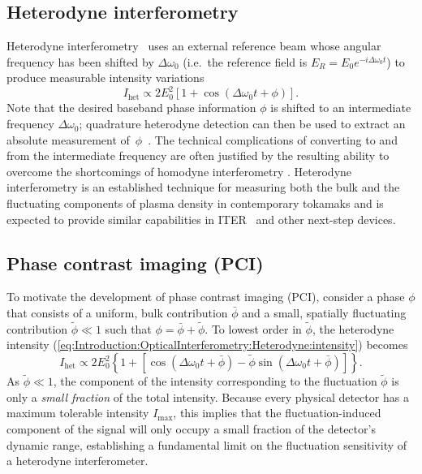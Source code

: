 \subsection{Heterodyne interferometry}
Heterodyne interferometry~\cite{hutchinson_diagnostics}
uses an external reference beam
whose angular frequency has been shifted by $\Delta \omega_0$
(i.e.\ the reference field is $E_R = E_0 e^{-i \Delta \omega_0 t}$)
to produce measurable intensity variations
\begin{equation}
  I_{\text{het}}
  \propto
  2E_0^2 \left[
    1 + \cos \left(\Delta \omega_0 t + \phi \right)
  \right].
  \label{eq:Introduction:OpticalInterferometry:Heterodyne:intensity}
\end{equation}
Note that the desired baseband phase information $\phi$ is shifted
to an intermediate frequency $\Delta \omega_0$;
quadrature heterodyne detection can then be used
to extract an absolute measurement of~$\phi$~\cite{carlstrom_rsi88}.
The technical complications of converting to and from
the intermediate frequency
are often justified by the resulting ability
to overcome the shortcomings of homodyne interferometry
\cite{hutchinson_diagnostics, nazikian_rsi87}.
Heterodyne interferometry is an established technique
for measuring both the bulk and the fluctuating components of plasma density
in contemporary tokamaks
\cite{carlstrom_rsi88, vanzeeland_ppcf05, mlynek_fst12, kasten_rsi12}
and is expected to provide similar capabilities
in ITER~\cite{vanzeeland_TIP_rsi13} and other next-step devices.


\subsection{Phase contrast imaging (PCI)}
\label{sec:Introduction:OpticalInterferometry:pci}
To motivate the development of phase contrast imaging (PCI),
consider a phase $\phi$ that consists of a
uniform, bulk contribution $\bar{\phi}$ and
a small, spatially fluctuating contribution $\tilde{\phi} \ll 1$ such that
$\phi = \bar{\phi} + \tilde{\phi}$.
To lowest order in $\tilde{\phi}$,
the heterodyne intensity
(\ref{eq:Introduction:OpticalInterferometry:Heterodyne:intensity})
becomes
\begin{equation}
  I_{\text{het}}
  \propto
  2 E_0^2 \left\{
    1
    +
    \left[
      \cos \left(\Delta \omega_0 t + \bar{\phi} \right)
      -
      \tilde{\phi} \sin \left( \Delta \omega_0 t + \bar{\phi} \right)
    \right]
  \right\}.
\end{equation}
As $\tilde{\phi} \ll 1$,
the component of the intensity
corresponding to the fluctuation $\tilde{\phi}$
is only a \emph{small fraction} of the total intensity.
Because every physical detector
has a maximum tolerable intensity $I_{\text{max}}$,
this implies that the fluctuation-induced component of the signal
will only occupy a small fraction
of the detector's dynamic range,
establishing a fundamental limit
on the fluctuation sensitivity of a heterodyne interferometer.

